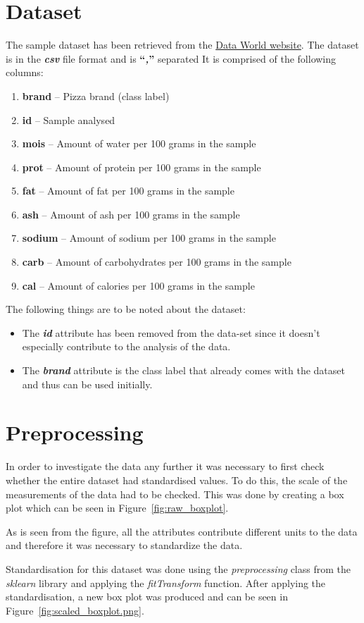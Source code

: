 \documentclass[preprint,12pt]{elsarticle}
\begin{document}
\section{Dataset}
\label{s:Dataset}
The sample dataset has been retrieved from the \href{https://data.world/sdhilip/pizza-datasets}{Data World website}.
The dataset is in the \textbf{\textit{csv}} file format and is \textbf{``\textit{,}'' }separated It is comprised of the following columns:
\begin{enumerate}
\item \textbf{brand} -- Pizza brand (class label)
\item \textbf{id} -- Sample analysed
\item \textbf{mois} -- Amount of water per 100 grams in the sample
\item \textbf{prot} -- Amount of protein per 100 grams in the sample
\item \textbf{fat} -- Amount of fat per 100 grams in the sample
\item \textbf{ash} -- Amount of ash per 100 grams in the sample
\item \textbf{sodium} -- Amount of sodium per 100 grams in the sample
\item \textbf{carb} -- Amount of carbohydrates per 100 grams in the sample
\item \textbf{cal} -- Amount of calories per 100 grams in the sample
\end{enumerate}
\par
The following things are to be noted about the dataset:
\begin{itemize}
\item The \textbf{\textit{id}} attribute has been removed from the data-set since it doesn't  especially contribute to the analysis of the data.
\item The \textbf{\textit{brand}} attribute is the class label that already comes with the dataset and thus can be used initially.
\end{itemize}
\section{Preprocessing}
\label{ss:Preprocessing}
In order to investigate the data any further it was necessary to first check whether the entire dataset had standardised values. To do this, the
scale of the measurements of the data had to be checked. This was done by creating a box plot which can be seen in Figure~\ref{fig:raw_boxplot}.
\par
As is seen from the figure, all the attributes contribute different units to the data and therefore it was necessary to standardize the data.
\par
Standardisation for this dataset was done using the \textit{preprocessing} class from the \textit{sklearn} library \cite{scaling2020}  and applying the \textit{fitTransform}
function. After applying the standardisation, a new box plot was produced and can be seen in Figure~\ref{fig:scaled_boxplot.png}.
\end{document}

